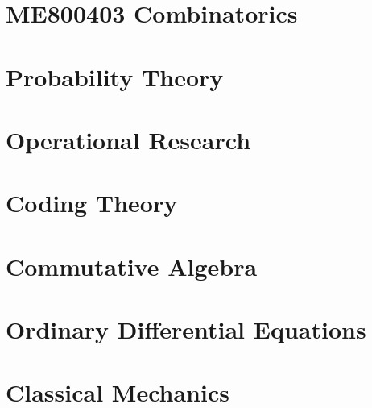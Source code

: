 \documentclass[a4paper,10pt,openany]{book}
\begin{document}
\chapter{ME800403 Combinatorics}


\chapter{Probability Theory}

\chapter{Operational Research}

\chapter{Coding Theory}


\chapter{Commutative Algebra}

\chapter{Ordinary Differential Equations}

\chapter{Classical Mechanics}


%


\end{document}
